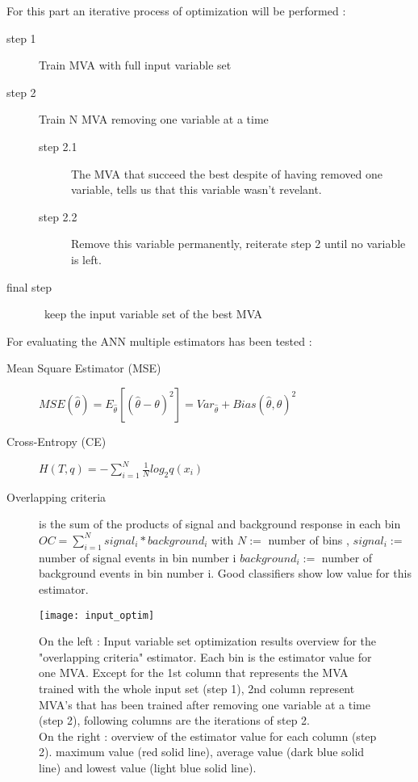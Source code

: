 For this part an iterative process of optimization will be performed :
\begin{description}
	\item [step 1] Train MVA with full input variable set
	\item [step 2] Train N MVA removing one variable at a time
	\begin{description}
		\item [step 2.1] The MVA that succeed the best despite of having removed one variable, tells us that this variable wasn't revelant.
		\item [step 2.2] Remove this variable permanently, reiterate step 2 until no variable is left.
	\end{description}
	\item [final step] keep the input variable set of the best MVA
\end{description}

For evaluating the ANN multiple estimators has been tested :
\begin{description}
	\item [Mean Square Estimator (MSE)] $ MSE(\hat{\theta}) = E_{\hat{\theta}} [(\hat{\theta} - \theta)^2] =
    Var_{\hat{\theta}} + Bias(\hat{\theta}, \theta)^2$
	\item [Cross-Entropy (CE)] $ H(T,q) = -\sum_{i=1}^{N}{\frac{1}{N} log_2 q(x_i)}$
	\item [Overlapping criteria] is the sum of the products of signal and background response in each bin $ OC =
    \sum_{i=1}^{N}{signal_i*background_i} $ with $N :=$ number of bins , $signal_i := $ number of signal events in bin
    number i $background_i := $ number of background events in bin number i. Good classifiers show low value for this estimator.
\end{description}

\begin{figure}[h!]
\centering
    \texttt{[image: input\_optim]}
    \caption{On the left : Input variable set optimization results overview for the "overlapping criteria" estimator.
    Each bin is the estimator value for one MVA. Except for
    the 1st column that represents the MVA trained with the whole input set (step 1), 2nd column
    represent MVA's that has been trained after removing one variable at a time (step 2), following columns are the
    iterations of step 2.\\
    On the right : overview of the estimator value for each column (step 2). maximum value (red solid line), average
    value (dark blue solid line) and lowest value (light blue solid line).}
    \label{input_optim}
\end{figure}

